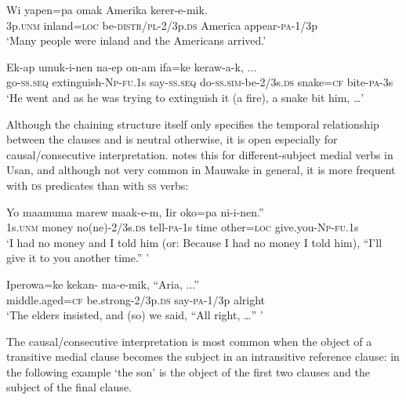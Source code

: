 \ea%
\label{ex:8:x1503}
\gll Wi  yapen=pa  omak  Amerika  kerer-e-mik.\\
3p.\textsc{unm} inland=\textsc{loc} be-\textsc{distr}/\textsc{pl}-2/3p.\textsc{ds} America appear-\textsc{pa}-1/3p\\
\glt`Many people were inland and the Americans arrived.'
\z


\ea%
\label{ex:8:x1472}
\gll Ek-ap  umuk-i-nen  na-ep  on-am ifa=ke  keraw-a-k,  ...\\
go-\textsc{ss}.\textsc{seq} extinguish-\textsc{Np}-\textsc{fu}.1s  say-\textsc{ss}.\textsc{seq} do-\textsc{ss}.\textsc{sim}-be-2/3s.\textsc{ds} snake=\textsc{cf} bite-\textsc{pa}-3s\\
\glt`He went and as he was trying to extinguish it (a fire), a snake bit him, {\dots}'
\z


Although the chaining structure itself only specifies the temporal relationship between the clauses and is neutral otherwise, it is open especially for causal/consecutive interpretation. \citet[237]{Reesink1983} notes this for different-subject medial verbs in Usan, and although not very common in Mauwake in general, it is more frequent with \textsc{ds} predicates than with \textsc{ss} verbs:

\ea%
\label{ex:8:x1434}
\gll Yo  maamuma  marew maak-e-m, {\textquotedbl}Iir  oko=pa  ni-i-nen.''\\
1s.\textsc{unm} money no(ne)-2/3s.\textsc{ds} tell-\textsc{pa}-1s time  other=\textsc{loc} give.you-\textsc{Np}-\textsc{fu}.1s\\
\glt`I had no money and I told him (or: Because I had no money I told him), ``I'll give it to you another time.'' '
\z


\ea%
\label{ex:8:x1412}
\gll Iperowa=ke  kekan-  ma-e-mik,  ``Aria,  ...'' \\
middle.aged=\textsc{cf} be.strong-2/3p.\textsc{ds} say-\textsc{pa}-1/3p alright\\
\glt`The elders insisted, and (so) we said, ``All right, {\dots}'' '
\z


The causal/consecutive interpretation is most common when the object of a transitive medial clause becomes the subject in an intransitive reference clause: in the following example `the son' is the object of the first two clauses and the subject of the final clause.

